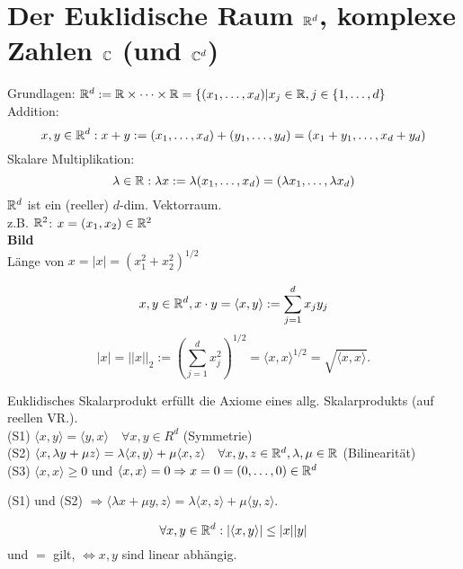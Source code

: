 \documentclass[../ana1.tex]{subfiles}
\begin{document}
\setcounter{section}{11}

\section{Der Euklidische Raum \( \mathbb{R}^d \), komplexe Zahlen \( \mathbb{C} \) (und \(\mathbb{C}^d \))}
Grundlagen: \( \mathbb{R}^d := \mathbb{R} \times \cdots \times \mathbb{R} = \{ (x_1, \dots, x_d) | x_j \in\mathbb{R}, j\in \{1,\dots, d \} \) \\
Addition:
\[x, y \in \mathbb{R}^d: x + y := (x_1, \dots , x_d) + (y_1, \dots, y_d) = (x_1 + y_1, \dots, x_d + y_d) \]
Skalare Multiplikation:
\[\lambda \in \mathbb{R}: \lambda x := \lambda(x_1, \dots , x_d) = (\lambda x_1, \dots, \lambda x_d) \]
\( \mathbb{R}^d \) ist ein (reeller) \(d\)-dim. Vektorraum.\\
z.B. \(\mathbb{R}^2\): \(x = (x_1, x_2) \in \mathbb{R}^2\) \\
\textbf{Bild}\\%
Länge von \(x = |x| = {{(x_1^2 + x_2^2)}^{1/2}}\)
\begin{defi}
	\[ x,y \in\mathbb{R}^d, x\cdot y = \langle x,y\rangle := \sum_{j=1}^{d}x_j y_j \]
	\[ |x| = ||x||_2 := {(\sum_{j=1}^{d} x_j^2 )}^{1/2} = \langle x,x\rangle^{1/2} = \sqrt{\langle x,x\rangle}. \]
\end{defi}
\begin{bem}
	Euklidisches Skalarprodukt erfüllt die Axiome eines allg. Skalarprodukts (auf reellen VR.).\\
	(S1) \( \langle x,y\rangle = \langle y,x\rangle \quad\forall x,y\in R^d \) (Symmetrie)\\
	(S2) \( \langle x, \lambda y + \mu z\rangle = \lambda \langle x,y\rangle + \mu\langle x,z\rangle \quad \forall x,y,z\in\mathbb{R}^d, \lambda, \mu \in\mathbb{R} \) (Bilinearität)\\
	(S3) \( \langle x,x\rangle \geq 0 \) und \( \langle x,x\rangle = 0 \Rightarrow x=0 = (0,\dots,0) \in\mathbb{R}^d \)
\end{bem}
\begin{bem}
	(S1) und (S2) \( \Rightarrow \langle\lambda x + \mu y, z\rangle = \lambda  \langle x,z\rangle + \mu \langle y,z\rangle \).
\end{bem}
\begin{satz}
	\[ \forall x,y\in\mathbb{R}^d: |\langle x,y\rangle|\leq |x||y|\]
	und \glqq{}\(=\)\grqq{} gilt, \( \Leftrightarrow x,y \) sind linear abhängig.
\end{satz}
\end{document}
